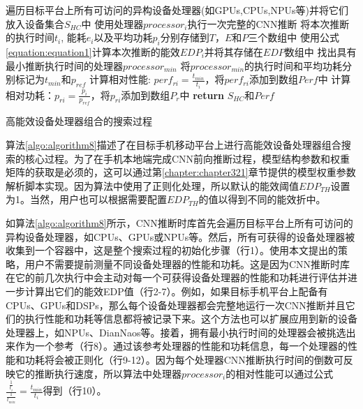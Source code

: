 \begin{algorithm}[htbp]
  \small
  \SetAlgoLined
    \begin{spacing}{0.8}
    遍历目标平台上所有可访问的异构设备处理器(如GPUs,CPUs,NPUs等)并将它们放入设备集合$S_{HC}$中\;
     {
        使用处理器$processor_i$执行一次完整的CNN推断\;
        将本次推断的执行时间$t_i$, 能耗$e_i$以及平均功耗$p_i$分别存储到$T$，$E$和$P$三个数组中\;
        使用公式\ref{equation:equation1}计算本次推断的能效$EDP_i$并将其存储在$EDP$数组中\;
    }
    找出具有最小推断执行时间的处理器$processor_{min}$\;
    将$processor_{min}$的执行时间和平均功耗分别标记为$t_{min}$和$p_{ref}$\;
     {
    计算相对性能: $perf_{ri} = \frac{t_{min}}{t_i}$，将$perf_{ri}$添加到数组$Perf$中\;
    计算相对功耗：$p_{ri} = \frac{p_{i}}{p_{ref}}$，将$p_{ri}$添加到数组$P_r$中\;
    }
    \textbf{return} $S_{HC}$和$Perf$\;
   \end{spacing}
  \caption{高能效设备处理器组合的搜索过程}
  \label{algo:algorithm8}
\end{algorithm}

算法\ref{algo:algorithm8}描述了在目标手机移动平台上进行高能效设备处理器组合搜索的核心过程。为了在手机本地端完成CNN前向推断过程，模型结构参数和权重矩阵的获取是必须的，这可以通过第\ref{chapter:chapter321}章节提供的模型权重参数解析脚本实现。因为算法中使用了正则化处理，所以默认的能效阈值$EDP_{TH}$设置为1。当然，用户也可以根据需要配置$EDP_{TH}$的值以得到不同的能效折中。

如算法\ref{algo:algorithm8}所示，CNN推断时库首先会遍历目标平台上所有可访问的异构设备处理器，如CPUs、GPUs或NPUs等。然后，所有可获得的设备处理器被收集到一个容器中，这是整个搜索过程的初始化步骤（行1）。使用本文提出的策略，用户不需要提前测量不同设备处理器的性能和功耗。这是因为CNN推断时库在它的前几次执行中会主动对每一个可获得设备处理器的性能和功耗进行评估并进一步计算出它们的能效EDP值（行2-7）。例如，如果目标手机平台上配备有CPUs、GPUs和DSPs，那么每个设备处理器都会完整地运行一次CNN推断并且它们的执行性能和功耗等信息都将被记录下来。这个方法也可以扩展应用到新的设备处理器上，如NPUs、DianNaos\cite{chen2014diannao}等。接着，拥有最小执行时间的处理器会被挑选出来作为一个参考（行8）。通过该参考处理器的性能和功耗信息，每一个处理器的性能和功耗将会被正则化（行9-12）。因为每个处理器CNN推断执行时间的倒数可反映它的推断执行速度，所以算法中处理器$processor_i$的相对性能可以通过公式$\frac{\frac{1}{t_i}}{\frac{1}{t_{min}}}=\frac{t_{min}}{t_i}$得到（行10）。

